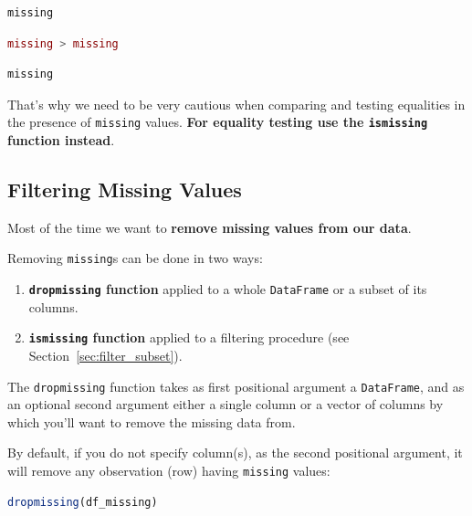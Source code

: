 \documentclass[
  notoc %
]{tufte-book}
\providecommand{\tightlist}{%
  \setlength{\itemsep}{0pt}\setlength{\parskip}{0pt}
}
\newcommand{\passthrough}[1]{#1}
\begin{document}
\begin{lstlisting}[language=Output]
missing
\end{lstlisting}

\begin{lstlisting}[language=Julia]
missing > missing
\end{lstlisting}

\begin{lstlisting}[language=Output]
missing
\end{lstlisting}

That's why we need to be very cautious when comparing and testing
equalities in the presence of \passthrough{\lstinline!missing!} values.
\textbf{For equality testing use the \passthrough{\lstinline!ismissing!}
function instead}.

\hypertarget{sec:missing_filter}{%
\subsection{Filtering Missing Values}\label{sec:missing_filter}}

Most of the time we want to \textbf{remove missing values from our
data}.

Removing \passthrough{\lstinline!missing!}s can be done in two ways:

\begin{enumerate}
\def\labelenumi{\arabic{enumi}.}
\tightlist
\item
  \textbf{\passthrough{\lstinline!dropmissing!} function} applied to a
  whole \passthrough{\lstinline!DataFrame!} or a subset of its columns.
\item
  \textbf{\passthrough{\lstinline!ismissing!} function} applied to a
  filtering procedure (see Section~\ref{sec:filter_subset}).
\end{enumerate}

The \passthrough{\lstinline!dropmissing!} function takes as first
positional argument a \passthrough{\lstinline!DataFrame!}, and as an
optional second argument either a single column or a vector of columns
by which you'll want to remove the missing data from.

By default, if you do not specify column(s), as the second positional
argument, it will remove any observation (row) having
\passthrough{\lstinline!missing!} values:

\begin{lstlisting}[language=Julia]
dropmissing(df_missing)
\end{lstlisting}
\end{document}
